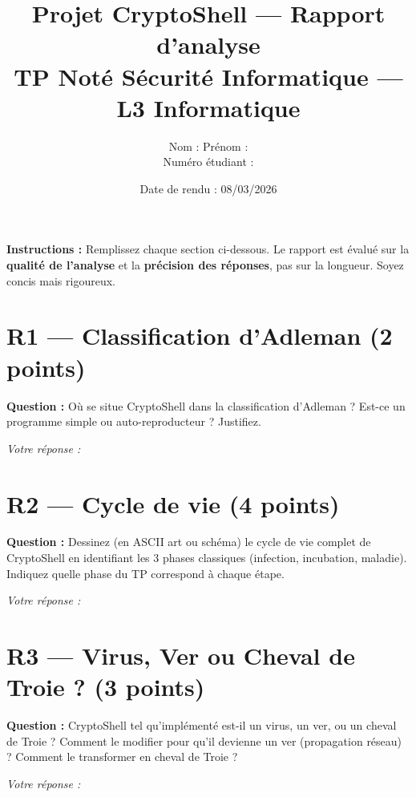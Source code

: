 \documentclass[a4paper,11pt]{article}
\title{\textbf{Projet CryptoShell --- Rapport d'analyse}\\
\large TP Not\'e S\'ecurit\'e Informatique --- L3 Informatique}
\author{Nom : \underline{\hspace{5cm}} \quad Pr\'enom : \underline{\hspace{5cm}} \\[0.5em]
Num\'ero \'etudiant : \underline{\hspace{5cm}}}
\date{Date de rendu : 08/03/2026}
\begin{document}
\maketitle

\noindent\textbf{Instructions :} Remplissez chaque section ci-dessous. Le rapport est \'evalu\'e sur la \textbf{qualit\'e de l'analyse} et la \textbf{pr\'ecision des r\'eponses}, pas sur la longueur. Soyez concis mais rigoureux.

\bigskip

\section*{R1 --- Classification d'Adleman (2 points)}

\textbf{Question :} O\`u se situe CryptoShell dans la classification d'Adleman ? Est-ce un programme simple ou auto-reproducteur ? Justifiez.

\bigskip
\noindent\textit{Votre r\'eponse :}
\vspace{4cm}

\section*{R2 --- Cycle de vie (4 points)}

\textbf{Question :} Dessinez (en ASCII art ou sch\'ema) le cycle de vie complet de CryptoShell en identifiant les 3 phases classiques (infection, incubation, maladie). Indiquez quelle phase du TP correspond \`a chaque \'etape.

\bigskip
\noindent\textit{Votre r\'eponse :}
\vspace{6cm}

\section*{R3 --- Virus, Ver ou Cheval de Troie ? (3 points)}

\textbf{Question :} CryptoShell tel qu'impl\'ement\'e est-il un virus, un ver, ou un cheval de Troie ? Comment le modifier pour qu'il devienne un ver (propagation r\'eseau) ? Comment le transformer en cheval de Troie ?

\bigskip
\noindent\textit{Votre r\'eponse :}
\vspace{5cm}

\end{document}
